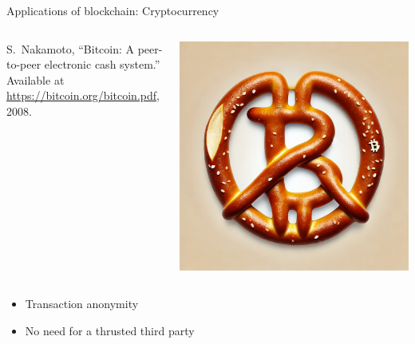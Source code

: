 \documentclass{beamer}
\begin{document}
\begin{frame}{Applications of blockchain: Cryptocurrency}
\begin{columns}
\begin{column}{0.5\textwidth}
   
{\footnotesize
\begin{thebibliography}{1}
S.~Nakamoto, ``Bitcoin: A peer-to-peer electronic cash system.'' Available at
  \href{https://bitcoin.org/bitcoin.pdf}{https://bitcoin.org/bitcoin.pdf},
  2008.
\end{thebibliography}  
}
\end{column}
\begin{column}{0.5\textwidth}  %
    \begin{center}
     \includegraphics[width=\textwidth]{../../Figures/bretzel_bitcoin.png}
     \end{center}
\end{column}
\end{columns}
\begin{itemize}
  \item Transaction anonymity
  \item No need for a thrusted third party
\end{itemize}


\end{frame}
\end{document}
